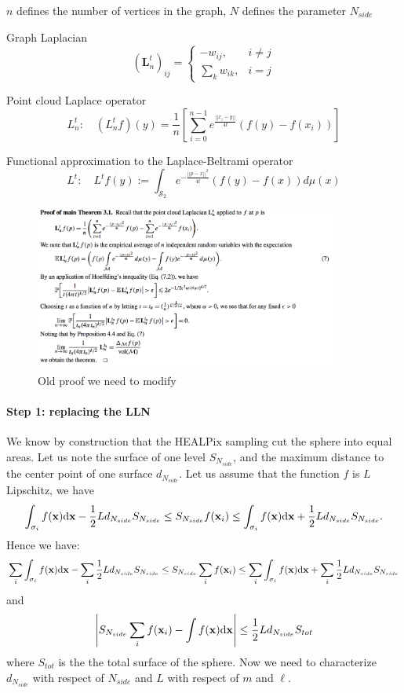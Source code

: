 $n$ defines the number of vertices in the graph, $N$ defines the parameter $N_{side}$
\begin{definition}{Graph Laplacian}
	$$ \left(\mathbf L_n^t\right)_{ij}=\begin{cases}
	-w_{ij}, & i\neq j\\
	\sum_{k}w_{ik}, & i=j
	\end{cases}$$
\end{definition}
\begin{definition}{Point cloud Laplace operator}
	$$L_n^t:\quad(L_n^tf)(y) = \frac{1}{n}\left[ \sum_{i=0}^{n-1} e^\frac{||x_i-y||}{4t}\left(f(y)-f(x_i)\right)\right]$$
\end{definition}
\begin{definition}{Functional approximation to the Laplace-Beltrami operator} \label{eq: my L^t}
	$$L^t:\quad L^tf(y) := \int_{\mathcal S_2}e^{-\frac{||p-x||^2}{4t}}\left(f(y)-f(x)\right)d\mu(x)$$
\end{definition}
\begin{figure}[h!]
	\label{fig:Belkin proof}
	\caption{Old proof we need to modify}
	\centering
	\includegraphics[width=0.9\textwidth]{Figs/03/oldproof.png}
\end{figure}
\paragraph{Step 1: replacing the LLN}

We know by construction that the HEALPix sampling cut the sphere into equal areas. Let us note the surface of one level $S_{N_{side}}$, and the maximum distance to the center point of one surface\textbf{ $d_{N_{side}}$}.
Let us assume that the function $f$ is $L$ Lipschitz, we have
\[
\int_{\sigma_{i}}f({\bf x})\text{d}{\bf x}-\frac{1}{2}Ld_{N_{side}}S_{N_{side}}\leq S_{N_{side}}f({\bf x}_{i})\leq\int_{\sigma_{i}}f({\bf x})\text{d}{\bf x}+\frac{1}{2}Ld_{N_{side}}S_{N_{side}}.
\]
Hence we have:
\[
\sum_{i}\int_{\sigma_{i}}f({\bf x})\text{d}{\bf x}-\sum_{i}\frac{1}{2}Ld_{N_{side}}S_{N_{side}}\leq S_{N_{side}}\sum_{i}f({\bf x}_{i})\leq\sum_{i}\int_{\sigma_{i}}f({\bf x})\text{d}{\bf x}+\sum_{i}\frac{1}{2}Ld_{N_{side}}S_{N_{side}}
\]
and 
\[
\left|S_{N_{side}}\sum_{i}f({\bf x}_{i})-\int f({\bf x})\text{d}{\bf x}\right|\le\frac{1}{2}Ld_{N_{side}}S_{tot}
\]
where $S_{tot}$ is the the total surface of the sphere. Now we need to characterize $d_{N_{side}}$ with respect of $N_{side}$ and $L$ with respect of $m$ and $\ell$. 

